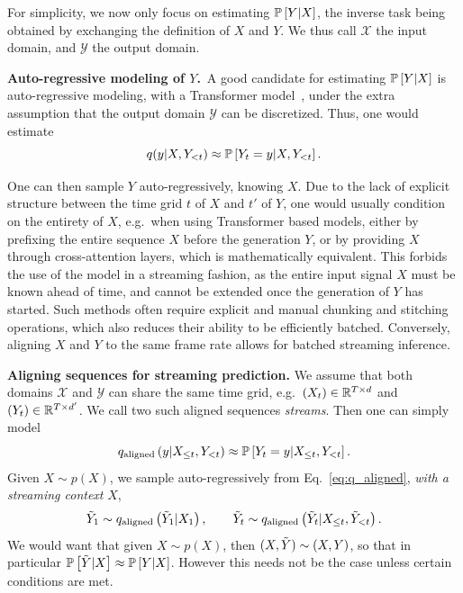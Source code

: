 For simplicity, we now only focus on estimating $\mathbb{P}\left[Y|X\right]$, the inverse task being obtained by
exchanging the definition of $X$ and $Y$. We thus call $\mathcal{X}$ the input domain, and $\mathcal{Y}$ the output domain.

\textbf{Auto-regressive modeling of $Y$.}\ 
A good candidate for estimating $\mathbb{P}\left[Y | X\right]$ is auto-regressive modeling, with a Transformer model~\citep{attentionvaswani}, under the extra assumption that the output domain $\mathcal{Y}$ can be discretized. Thus, one would estimate
\begin{equation}
    q(y | X, Y_{< t}) \approx \mathbb{P}\left[Y_t=y | X, Y_{<t}\right].
\end{equation}

One can then sample $Y$ auto-regressively, knowing $X$.
Due to the lack of explicit structure between the time grid $t$ of $X$ and $t'$ of $Y$,
one would usually condition on the entirety of $X$, e.g.\ when using Transformer based models, 
either by prefixing the entire sequence
$X$ before the generation $Y$, or by providing $X$ through cross-attention layers, which is mathematically equivalent. 
This forbids the use of the model in a streaming fashion, as the entire input signal $X$ must be known ahead of time, and cannot be extended once the generation of $Y$ has started.
Such methods often require explicit and manual chunking and stitching operations, which also reduces their ability to be efficiently batched. Conversely, aligning $X$ and $Y$ to the same frame rate allows for batched streaming inference.

\textbf{Aligning sequences for streaming prediction.}
We assume that both domains $\mathcal{X}$ and $\mathcal{Y}$ can share the same time grid,
e.g.\ $(X_t)\in\mathbb{R}^{T \times d}$ and $(Y_t)\in\mathbb{R}^{T \times d'}$. 
We call two such aligned sequences \emph{streams}. 
Then one can simply model%
\begin{equation}
\label{eq:q_aligned}
    q_{\text{aligned}}\left(y | X_{\leq t}, Y_{< t}\right) \approx \mathbb{P}\left[ Y_t = y|X_{\leq t}, Y_{< t}\right].
\end{equation}
Given $X\sim p(X)$, we sample auto-regressively from Eq.~\eqref{eq:q_aligned}, \emph{with a streaming context} $X$,
\begin{equation}
\label{eq:sample_ty}
   \tilde{Y}_1 \sim  q_{\text{aligned}}\left(\tilde{Y}_1 | X_1\right), \qquad
   \tilde{Y}_t \sim q_{\text{aligned}}\left(\tilde{Y}_t | X_{\leq t}, \tilde{Y}_{< t}\right).
\end{equation}
We would want that given $X\sim p(X)$, then $(X, \tilde{Y})\sim(X, Y)$,
so that in particular $\mathbb{P}\left[\tilde{Y} | X\right] \approx \mathbb{P}\left[Y | X\right]$.
However this needs not be the case unless certain conditions are met.

